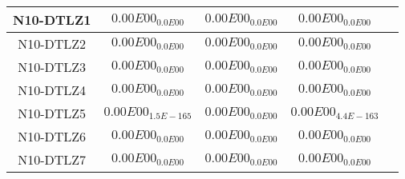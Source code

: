 \documentclass{article}
\begin{document}
\begin{table*}[ht!]
\begin{tabular}{|c||c||c||c||c|}
\hline
N10-DTLZ1 &\cellcolor{gray95}$0.00E00_{0.0E00}$ &\cellcolor{gray25}$0.00E00_{0.0E00}$ &$0.00E00_{0.0E00}$\\ 
\hline
N10-DTLZ2 &\cellcolor{gray95}$0.00E00_{0.0E00}$ &\cellcolor{gray25}$0.00E00_{0.0E00}$ &$0.00E00_{0.0E00}$\\ 
\hline
N10-DTLZ3 &\cellcolor{gray95}$0.00E00_{0.0E00}$ &\cellcolor{gray25}$0.00E00_{0.0E00}$ &$0.00E00_{0.0E00}$\\ 
\hline
N10-DTLZ4 &\cellcolor{gray95}$0.00E00_{0.0E00}$ &\cellcolor{gray25}$0.00E00_{0.0E00}$ &$0.00E00_{0.0E00}$\\ 
\hline
N10-DTLZ5 &\cellcolor{gray25}$0.00E00_{1.5E-165}$ &\cellcolor{gray95}$0.00E00_{0.0E00}$ &$0.00E00_{4.4E-163}$\\ 
\hline
N10-DTLZ6 &\cellcolor{gray95}$0.00E00_{0.0E00}$ &\cellcolor{gray25}$0.00E00_{0.0E00}$ &$0.00E00_{0.0E00}$\\ 
\hline
N10-DTLZ7 &\cellcolor{gray95}$0.00E00_{0.0E00}$ &\cellcolor{gray25}$0.00E00_{0.0E00}$ &$0.00E00_{0.0E00}$\\ 
\hline
\end{tabular}
\end{table*}
\end{document}
